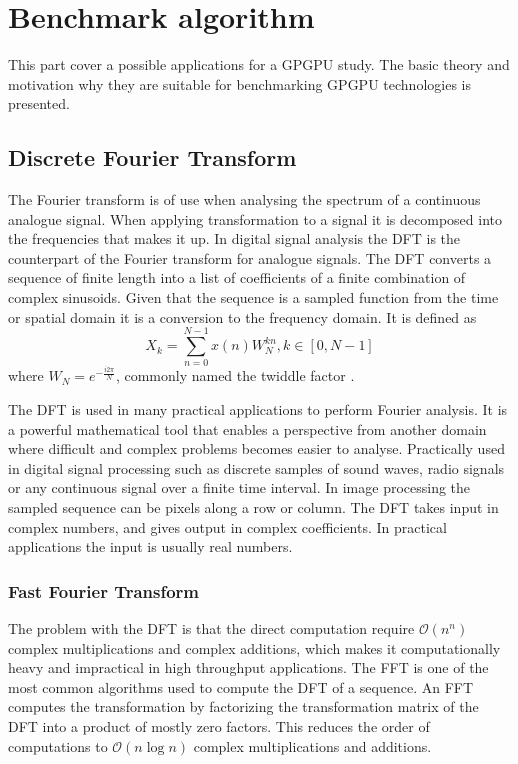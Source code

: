 \chapter{Benchmark algorithm}\label{cha:algorithms}
This part cover a possible applications for a \gls{GPGPU} study. The basic theory and motivation why they are suitable for benchmarking \gls{GPGPU} technologies is presented.

\section{Discrete Fourier Transform}
The Fourier transform is of use when analysing the spectrum of a continuous analogue signal. When applying transformation to a signal it is decomposed into the frequencies that makes it up. In digital signal analysis the \gls{DFT} is the counterpart of the Fourier transform for analogue signals. The \gls{DFT} converts a sequence of finite length into a list of coefficients of a finite combination of complex sinusoids. Given that the sequence is a sampled function from the time or spatial domain it is a conversion to the frequency domain. It is defined as 
\begin{equation}
X_k=\sum_{n=0}^{N-1}x(n)W_N^{kn}, k \in {[0, N-1]}
\end{equation}
where $W_N=e^{-\frac{i2{\pi}}{N}}$, commonly named the twiddle factor \cite{gentleman1966fast}.

The \gls{DFT} is used in many practical applications to perform Fourier analysis. It is a powerful mathematical tool that enables a perspective from another domain where difficult and complex problems becomes easier to analyse. Practically used in digital signal processing such as discrete samples of sound waves, radio signals or any continuous signal over a finite time interval. In image processing the sampled sequence can be pixels along a row or column. The \gls{DFT} takes input in complex numbers, and gives output in complex coefficients. In practical applications the input is usually real numbers.

\subsection{Fast Fourier Transform}\label{sec:algorithms:fft}
The problem with the \gls{DFT} is that the direct computation require $\mathcal{O}(n^n)$ complex multiplications and complex additions, which makes it computationally heavy and impractical in high throughput applications. The \gls{FFT} is one of the most common algorithms used to compute the \gls{DFT} of a sequence. An \gls{FFT} computes the transformation by factorizing the transformation matrix of the \gls{DFT} into a product of mostly zero factors. This reduces the order of computations to $\mathcal{O}(n\log{}n)$ complex multiplications and additions.

